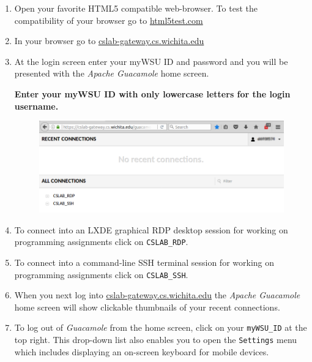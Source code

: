 \documentclass[12pt]{article}
\begin{document}
\begin{enumerate}
\item Open your favorite HTML5 compatible web-browser. To test the compatibility of your browser go to \href{https://html5test.com/}{html5test.com}
\item In your browser go to \href{https://cslab-gateway.cs.wichita.edu/}{cslab-gateway.cs.wichita.edu}
\item At the login screen enter your myWSU ID and password and you will be presented with the \textit{Apache Guacamole} home screen.

\textbf{Enter your myWSU ID with only lowercase letters for the login username.}

\begin{figure}[h]
\includegraphics[width=\linewidth]{screenshot_cslab_initial_homescreen}
\centering
\end{figure}
\item To connect into an LXDE graphical RDP desktop session for working on programming assignments click on \texttt{CSLAB\_RDP}.
\item To connect into a command-line SSH terminal session for working on programming assignments click on \texttt{CSLAB\_SSH}.
\item When you next log into \href{https://cslab-gateway.cs.wichita.edu/}{cslab-gateway.cs.wichita.edu} the \textit{Apache Guacamole} home screen will show clickable thumbnails of your recent connections.
\item To log out of \textit{Guacamole} from the home screen, click on your \texttt{myWSU\_ID} at the top right. This drop-down list also enables you to open the \texttt{Settings} menu which includes displaying an on-screen keyboard for mobile devices.


\end{enumerate}
\end{document}
